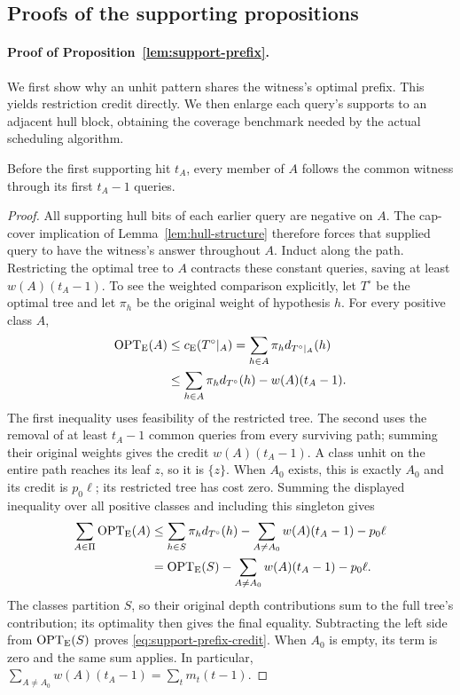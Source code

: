 \subsection{Proofs of the supporting propositions}

\paragraph{Proof of Proposition~\ref{lem:support-prefix}.}
We first show why an unhit pattern shares the witness's optimal
prefix. This yields restriction credit directly. We then enlarge
each query's supports to an adjacent hull block, obtaining the
coverage benchmark needed by the actual scheduling algorithm.

\begin{claim}
\label{clm:expected-prefix-constant}
Before the first supporting hit $t_A$, every member of $A$ follows
the common witness through its first $t_A-1$ queries.
\end{claim}
\begin{proof}
All supporting hull bits of each earlier query are negative on $A$.
The cap-cover implication of Lemma~\ref{lem:hull-structure}
therefore forces that supplied query
to have the witness's answer throughout $A$. Induct along the path.
Restricting the optimal tree to $A$ contracts these constant queries,
saving at least $w(A)(t_A-1)$. To see the weighted comparison
explicitly, let $T^\circ$ be the optimal tree and let
$\pi_h$ be the original weight of hypothesis $h$. For every positive
class $A$,
\[
 \begin{aligned}
 \operatorname{OPT}_{\mathrm E}(A)
 &\le c_{\mathrm E}(T^\circ|_A)
   =\sum_{h\in A}\pi_h d_{T^\circ|_A}(h)\\
 &\le\sum_{h\in A}\pi_h d_{T^\circ}(h)
         -w(A)(t_A-1).
 \end{aligned}
\]
The first inequality uses feasibility of the restricted tree.
The second uses the removal of at least $t_A-1$ common queries
from every surviving path; summing their original weights gives
the credit $w(A)(t_A-1)$.
A class unhit on the entire path reaches its leaf $z$, so it is
$\{z\}$. When $A_0$ exists, this is exactly $A_0$ and its credit is
$p_0\ell$; its restricted tree has cost zero. Summing the displayed
inequality over all positive classes and including this singleton
gives
\[
 \begin{aligned}
 \sum_{A\in\Pi}\operatorname{OPT}_{\mathrm E}(A)
 &\le\sum_{h\in S}\pi_h d_{T^\circ}(h)
       -\sum_{A\ne A_0}w(A)(t_A-1)-p_0\ell\\
 &=\operatorname{OPT}_{\mathrm E}(S)
       -\sum_{A\ne A_0}w(A)(t_A-1)-p_0\ell.
 \end{aligned}
\]
The classes partition $S$, so their original depth contributions
sum to the full tree's contribution; its optimality then gives
the final equality.
Subtracting the left side from $\operatorname{OPT}_{\mathrm E}(S)$ proves
\eqref{eq:support-prefix-credit}. When $A_0$ is empty, its term is
zero and the same sum applies. In particular,
$\sum_{A\ne A_0}w(A)(t_A-1)=\sum_t m_t(t-1)$.
\end{proof}

